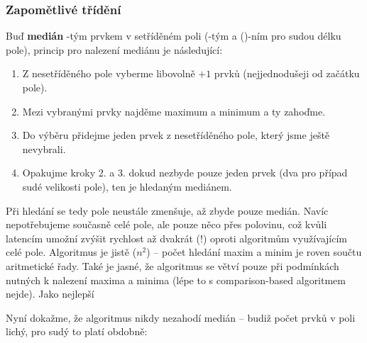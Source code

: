         \subsubsection{Zapomětlivé třídění}
        
        Buď \textbf{medián} \kk-tým prvkem v setříděném poli (\kk-tým a ()-ním pro sudou délku pole), princip pro nalezení mediánu je následující:
        \begin{enumerate}
          \item Z nesetříděného pole vyberme libovolně \kk$+1$ prvků (nejjednodušeji od začátku pole).
          \item Mezi vybranými prvky najděme maximum a minimum a ty zahoďme.
          \item Do výběru přidejme jeden prvek z nesetříděného pole, který jsme ještě nevybrali.
          \item Opakujme kroky 2. a 3. dokud nezbyde pouze jeden prvek (dva pro případ sudé velikosti pole), ten je hledaným mediánem.
        \end{enumerate}
        
        Při hledání se tedy pole neustále zmenšuje, až zbyde pouze medián. Navíc nepotřebujeme současně celé pole, ale pouze něco přes polovinu, což kvůli latencím umožní zvýšit rychlost až dvakrát (!) oproti algoritmům využívajícím celé pole. Algoritmus je jistě \OOO($n^2$) -- počet hledání maxim a minim je roven součtu aritmetické řady. Také je jasné, že algoritmus se větví pouze při podmínkách nutných k nalezení maxima a minima (lépe to s comparison-based algoritmem nejde). Jako nejlepší 
        
        Nyní dokažme, že algoritmus nikdy nezahodí medián -- budiž počet prvků v poli lichý, pro sudý to platí obdobně:
        
